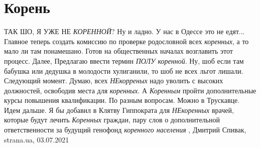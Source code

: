  
 
 
 
 
\chapter{Корень}



ТАК ШО, Я УЖЕ НЕ \emph{КОРЕННОЙ}?  Ну и ладно. У нас в Одессе это не едят...
Главное теперь создать комиссию по проверке родословной всех \emph{коренных}, а
то мало ли там понамешано. Готов на общественных началах возглавить этот
процесс.  Далее, Предлагаю ввести термин \emph{ПОЛУ коренной}. Ну, шоб если там
бабушка или дедушка в молодости хулиганили, то шоб не всех льгот лишали.
Следующий момент. Думаю, всех \emph{НЕкорреных} надо уволить с высоких
должностей, освободив места для \emph{коренных}. А \emph{Коренным} пройти
дополнительные курсы повышения квалификации. По разным вопросам. Можно в
Трускавце.  Идем дальше. Я бы добавил в Клятву Гиппократа для \emph{НЕкоренных}
врачей, которые будут лечить \emph{Коренных} граждан, пару слов о
дополнительной ответственности за будущий генофонд \emph{коренного населения}
   , Дмитрий Спивак, strana.ua, 03.07.2021
